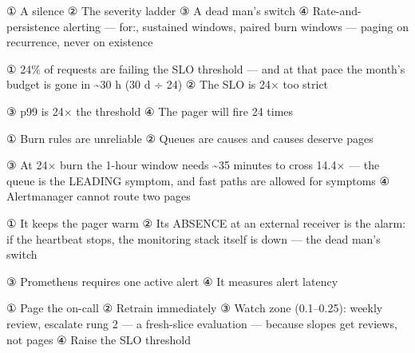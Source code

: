 
\begin{tbboptions}
  \item ① A silence        ② The severity ladder        ③ A dead man’s switch        ④ Rate-and-persistence alerting — for:, sustained windows, paired burn windows — paging on recurrence, never on existence
\end{tbboptions}


\begin{tbboptions}
  \item ① 24\% of requests are failing the SLO threshold — and at that pace the month’s budget is gone in \textasciitilde{}30 h (30 d ÷ 24)        ② The SLO is 24× too strict
  \item ③ p99 is 24× the threshold        ④ The pager will fire 24 times
\end{tbboptions}


\begin{tbboptions}
  \item ① Burn rules are unreliable        ② Queues are causes and causes deserve pages
  \item ③ At 24× burn the 1-hour window needs \textasciitilde{}35 minutes to cross 14.4× — the queue is the LEADING symptom, and fast paths are allowed for symptoms        ④ Alertmanager cannot route two pages
\end{tbboptions}


\begin{tbboptions}
  \item ① It keeps the pager warm        ② Its ABSENCE at an external receiver is the alarm: if the heartbeat stops, the monitoring stack itself is down — the dead man’s switch
  \item ③ Prometheus requires one active alert        ④ It measures alert latency
\end{tbboptions}


\begin{tbboptions}
  \item ① Page the on-call        ② Retrain immediately        ③ Watch zone (0.1–0.25): weekly review, escalate rung 2 — a fresh-slice evaluation — because slopes get reviews, not pages        ④ Raise the SLO threshold
\end{tbboptions}

